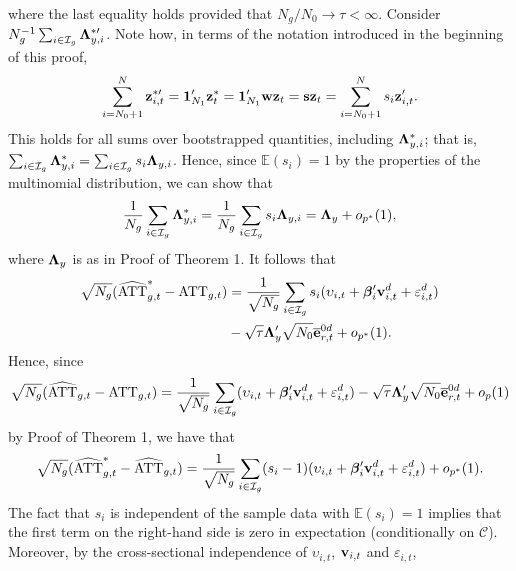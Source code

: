 \documentclass[12pt,fleqn]{article}
\begin{document}
where the last equality holds provided that $N_g/N_0\to\tau < \infty$. Consider $N_g^{-1}\sum_{i\in \mathcal{I}_g} \boldsymbol{\Lambda}_{y,i}^{*\prime}$. Note how, in terms of the notation introduced in the beginning of this proof,
\begin{equation}
\sum_{i = N_0+ 1}^{N} \mathbf{z}_{i,t}^{*\prime} = \mathbf{1}_{N_{1}}'\mathbf{z}_{t}^* =\mathbf{1}_{N_{1}}'\mathbf{w}\mathbf{z}_{t} = \mathbf{s} \mathbf{z}_{t} = \sum_{i=N_0 + 1}^{N} s_i\mathbf{z}_{i,t}' .
\end{equation}
This holds for all sums over bootstrapped quantities, including $\boldsymbol{\Lambda}_{y,i}^{*}$; that is, $\sum_{i\in \mathcal{I}_g} \boldsymbol{\Lambda}_{y,i}^{*} = \sum_{i\in \mathcal{I}_g} s_i\boldsymbol{\Lambda}_{y,i}$. Hence, since $\mathbb{E}(s_i) = 1$ by the properties of the multinomial distribution, we can show that
\begin{equation}
\frac{1}{N_g}\sum_{i\in \mathcal{I}_g} \boldsymbol{\Lambda}_{y,i}^{*} = \frac{1}{N_g}\sum_{i\in \mathcal{I}_g} s_i\boldsymbol{\Lambda}_{y,i} = \boldsymbol{\Lambda}_{y} + o_{p^*}(1),
\end{equation}
where $\boldsymbol{\Lambda}_{y}$ is as in Proof of Theorem 1. It follows that
\begin{align}
\sqrt{N_g}(\widehat{\mathrm{ATT}}_{g,t}^* - \mathrm{ATT}_{g,t}) &= \frac{1}{\sqrt{N_g}}\sum_{i\in \mathcal{I}_g} s_i(\upsilon_{i,t}  + \boldsymbol{\beta}_i'\mathbf{v}_{i,t}^{d} + \varepsilon_{i,t}^{d}) \notag\\
& - \sqrt{\tau} \boldsymbol{\Lambda}_{y}^{\prime}\sqrt{N_0}\overline{\mathbf{e}}_{r,t}^{0d} + o_{p^*}(1) .
\end{align}
Hence, since
\begin{align}
\sqrt{N_g}(\widehat{\mathrm{ATT}}_{g,t} - \mathrm{ATT}_{g,t}) = \frac{1}{\sqrt{N_g}}\sum_{i\in \mathcal{I}_g} (\upsilon_{i,t}  + \boldsymbol{\beta}_i'\mathbf{v}_{i,t}^{d} + \varepsilon_{i,t}^{d}) - \sqrt{\tau} \boldsymbol{\Lambda}_{y}^{\prime}\sqrt{N_0}\overline{\mathbf{e}}_{r,t}^{0d} + o_{p}(1)
\end{align}
by Proof of Theorem 1, we have that
\begin{align}
\sqrt{N_g}(\widehat{\mathrm{ATT}}_{g,t}^* - \widehat{\mathrm{ATT}}_{g,t}) = \frac{1}{\sqrt{N_g}}\sum_{i\in \mathcal{I}_g} (s_i-1)(\upsilon_{i,t}  + \boldsymbol{\beta}_i'\mathbf{v}_{i,t}^{d} + \varepsilon_{i,t}^{d})  + o_{p^*}(1) .
\end{align}
The fact that $s_i$ is independent of the sample data with $\mathbb{E}(s_i) = 1$ implies that the first term on the right-hand side is zero in expectation (conditionally on $\mathcal{C}$). Moreover, by the cross-sectional independence of $\upsilon_{i,t}$, $\mathbf{v}_{i,t}$ and $\varepsilon_{i,t}$,
\end{document}
